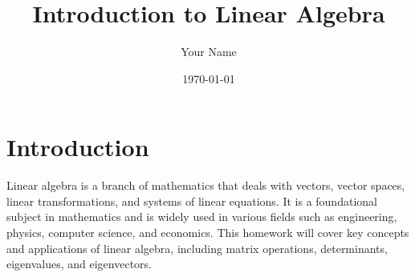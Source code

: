 \documentclass{article}
\title{Introduction to Linear Algebra}
\author{Your Name}
\date{\today}
\begin{document}
\maketitle

\section{Introduction}
Linear algebra is a branch of mathematics that deals with vectors, vector spaces, linear transformations, and systems of linear equations. It is a foundational subject in mathematics and is widely used in various fields such as engineering, physics, computer science, and economics. This homework will cover key concepts and applications of linear algebra, including matrix operations, determinants, eigenvalues, and eigenvectors.
\end{document}
